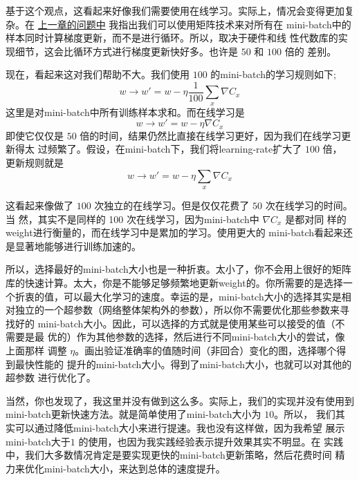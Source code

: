 基于这个观点，这看起来好像我们需要使用在线学习。实际上，情况会变得更加复杂。在%
\hyperref[ch:HowTheBackpropagationAlgorithmWorks]{上一章的问题中} 我指出我们可以使用矩阵技术来对所有在
\gls*{mini-batch}中的样本同时计算梯度更新，而不是进行循环。所以，取决于硬件和线
性代数库的实现细节，这会比循环方式进行梯度更新快好多。也许是 $50$ 和 $100$ 倍的
差别。

现在，看起来这对我们帮助不大。我们使用 $100$ 的\gls*{mini-batch}的学习规则如下;
\begin{equation}
  w \rightarrow w' = w-\eta \frac{1}{100} \sum_x \nabla C_x
  \label{eq:100}\tag{100}
\end{equation}
这里是对\gls*{mini-batch}中所有训练样本求和。而在线学习是
\begin{equation}
  w \rightarrow w' = w-\eta \nabla C_x
  \label{eq:101}\tag{101}
\end{equation}
即使它仅仅是 $50$ 倍的时间，结果仍然比直接在线学习更好，因为我们在线学习更新得太
过频繁了。假设，在\gls*{mini-batch}下，我们将\gls*{learning-rate}扩大了 $100$ 倍，
更新规则就是
\begin{equation}
  w \rightarrow w' = w-\eta \sum_x \nabla C_x
  \label{eq:102}\tag{102}
\end{equation}

这看起来像做了 $100$ 次独立的在线学习。但是仅仅花费了 $50$ 次在线学习的时间。当
然，其实不是同样的 100 次在线学习，因为\gls*{mini-batch}中 $\nabla C_x$ 是都对同
样的\gls*{weight}进行衡量的，而在线学习中是累加的学习。使用更大的%
\gls*{mini-batch}看起来还是显著地能够进行训练加速的。

所以，选择最好的\gls*{mini-batch}大小也是一种折衷。太小了，你不会用上很好的矩阵
库的快速计算。太大，你是不能够足够频繁地更新\gls*{weight}的。你所需要的是选择一
个折衷的值，可以最大化学习的速度。幸运的是，\gls*{mini-batch}大小的选择其实是相
对独立的一个超参数（网络整体架构外的参数），所以你不需要优化那些参数来寻找好的%
\gls*{mini-batch}大小。因此，可以选择的方式就是使用某些可以接受的值（不需要是最
  优的）作为其他参数的选择，然后进行不同\gls*{mini-batch}大小的尝试，像上面那样
调整 $\eta$。画出验证准确率的值随时间（非回合）变化的图，选择哪个得到最快性能的
提升的\gls*{mini-batch}大小。得到了\gls*{mini-batch}大小，也就可以对其他的超参数
进行优化了。

当然，你也发现了，我这里并没有做到这么多。实际上，我们的实现并没有使用到%
\gls*{mini-batch}更新快速方法。就是简单使用了\gls*{mini-batch}大小为 $10$。所以，
我们其实可以通过降低\gls*{mini-batch}大小来进行提速。我也没有这样做，因为我希望
展示\gls*{mini-batch}大于$1$ 的使用，也因为我实践经验表示提升效果其实不明显。在
实践中，我们大多数情况肯定是要实现更快的\gls*{mini-batch}更新策略，然后花费时间
精力来优化\gls*{mini-batch}大小，来达到总体的速度提升。\\

